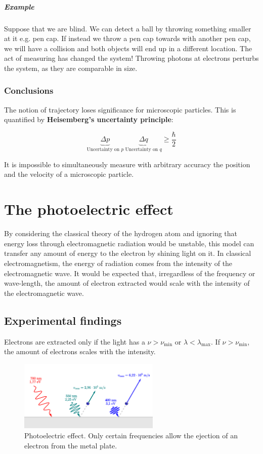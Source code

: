         \subparagraph{Example}
        Suppose that we are blind. We can detect a ball by throwing something smaller at it e.g. pen cap.
        If instead we throw a pen cap towards with another pen cap, we will have a collision and both objects will end up in a different location.
        The act of measuring has changed the system!
        Throwing photons at electrons perturbs the system, as they are comparable in size.

    \subsubsection{Conclusions}
    The notion of trajectory loses significance for microscopic particles.
    This is quantified by \textbf{Heisemberg's uncertainty principle}:

    $$\underbrace{\Delta p}_{\text{Uncertainty on }p}\ \underbrace{\Delta q }_{\text{Uncertainty on }q} \ge \frac{\hbar}{2}$$

    It is impossible to simultaneously measure with arbitrary accuracy the position and the velocity of a microscopic particle.

\section{The photoelectric effect}
By considering the classical theory of the hydrogen atom and ignoring that energy loss through electromagnetic radiation would be unstable, this model can transfer any amount of energy to the electron by shining light on it.
In classical electromagnetism, the energy of radiation comes from the intensity of the electromagnetic wave.
It would be expected that, irregardless of the frequency or wave-length, the amount of electron extracted would scale with the intensity of the electromagnetic wave.

  \subsection{Experimental findings}
  Electrons are extracted only if the light has a $\nu > \nu_{\min}$ or $\lambda<\lambda_{\max}$.
  If $\nu>\nu_{\min}$, the amount of electrons scales with the intensity.
\begin{figure}[h!]
    \centering
    \includegraphics[clip, width=0.6\textwidth]{photoelectric.png}
    \caption{\label{fig:photoelectric} Photoelectric effect. Only certain frequencies allow the ejection of an electron from the metal plate.}
\end{figure}
